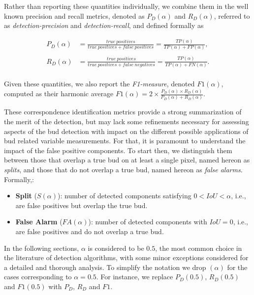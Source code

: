 \documentclass[a4paper,authoryear,review]{elsarticle}
\begin{document}
Rather than reporting these quantities individually, we combine them in the well known precision and recall metrics, denoted as $P_D(\alpha)$ and $R_D(\alpha)$, referred to as \emph{detection-precision} and \emph{detection-recall}, and defined formally as

\begin{align*}
       P_D(\alpha) &= \frac{true\ positives}{true\ positives+false\ positives}
       = \frac{TP(\alpha)}{TP(\alpha)+FP(\alpha)} ,\\
       \\
       R_D(\alpha) &= \frac{true\ positives}{true\ positives+false\ negatives}
       = \frac{TP(\alpha)}{TP(\alpha)+FN(\alpha)} .\\
  \end{align*}

Given these quantities, we also report the \emph{F1-measure}, denoted $F1(\alpha)$, computed as their harmonic average $F1(\alpha) = 2 \times \frac{P_D(\alpha) \times R_D(\alpha)}{P_D(\alpha) + R_D(\alpha)}$.

These correspondence identification metrics provide a strong summarization of the merit of the detection, but may lack some refinements necessary for assessing aspects of the bud detection with impact on the different possible applications of bud related variable measurements. For that, it is paramount to understand the impact of the false positive components. To start then, we distinguish them  between those that overlap a true bud on at least a single pixel, named hereon as \emph{splits}, and those that do not overlap a true bud, named hereon as \emph{false alarms}. Formally,:

\begin{itemize}
\item \textbf{Split} ($S(\alpha)$): number of detected components satisfying $0 < IoU < \alpha$, i.e., are false positives but overlap the true bud. 

\item \textbf{False Alarm} ($FA(\alpha)$): number of detected components with $IoU = 0$, i.e., are false positives and do not overlap a true bud.
\end{itemize}

In the following sections, $\alpha$ is considered to be $0.5$, the most common choice in the literature of detection algorithms, with some minor exceptions considered for a detailed and thorough analysis. To simplify the notation we drop $(\alpha)$ for the cases corresponding to $\alpha=0.5$. For instance, we replace $P_D(0.5)$, $R_D(0.5)$ and $F1(0.5)$ with $P_D$, $R_D$ and $F1$.
\end{document}
